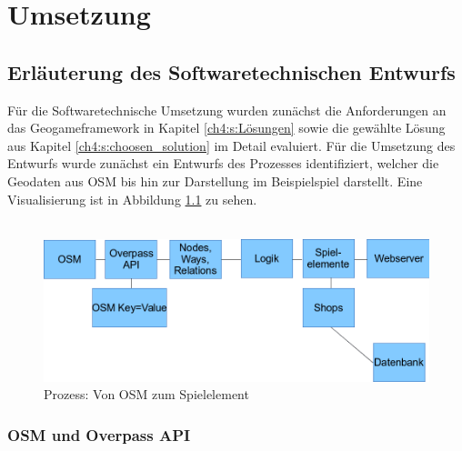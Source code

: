 \chapter{Umsetzung}
\label{ch:S5_Umsetzung}

\section{Erläuterung des Softwaretechnischen Entwurfs}

Für die Softwaretechnische Umsetzung wurden zunächst die Anforderungen an das Geogameframework in Kapitel \ref{ch4:s:Lösungen} sowie die gewählte Lösung aus Kapitel \ref{ch4:s:choosen_solution} im Detail evaluiert. Für die Umsetzung des Entwurfs wurde zunächst ein Entwurfs des Prozesses identifiziert, welcher die Geodaten aus OSM bis hin zur Darstellung im Beispielspiel darstellt. Eine Visualisierung ist in Abbildung \ref{img:ch5_img01_framework_progress} zu sehen.
\\\\

\begin{figure}[H]
\begin{center}
\includegraphics[width=140mm]{images/ch5_img01_framework_progress.png}
\caption{Prozess: Von OSM zum Spielelement}
\label{img:ch5_img01_framework_progress}
\end{center}
\end{figure}

\subsection*{OSM und Overpass API}

